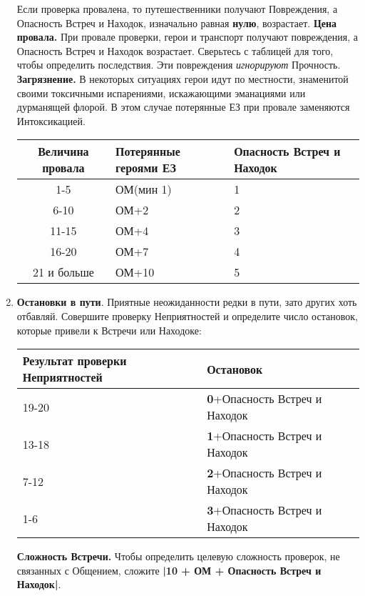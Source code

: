 \begin{enumerate}
\begin{center}
\begin{tabular}{|c|p{10cm}|}
\end{tabular}
\end{center}
Если проверка провалена, то путешественники получают Повреждения, а Опасность Встреч и Находок, изначально равная \textbf{нулю}, возрастает.
\newline \textbf{Цена провала.} При провале проверки, герои и транспорт получают повреждения, а Опасность Встреч и Находок возрастает. Сверьтесь с таблицей для того, чтобы определить последствия. Эти повреждения \textit{игнорируют} Прочность.
\newline \textbf{Загрязнение.} В некоторых ситуациях герои идут по местности, знаменитой своими токсичными испарениями, искажающими эманациями или дурманящей флорой. В этом случае потерянные ЕЗ при провале заменяются Интоксикацией.
\begin{center}
\begin{tabular}{|c|p{5cm}|p{5cm}|}
\hline
Величина провала & Потерянные героями ЕЗ & Опасность Встреч и Находок \\ \hline
1-5 & ОМ(мин 1) & 1 \\ \hline
6-10 & ОМ+2 & 2 \\ \hline
11-15 & ОМ+4 & 3 \\ \hline
16-20 & ОМ+7 & 4 \\ \hline
21 и больше & ОМ+10 & 5 \\ \hline
\end{tabular}
\end{center}
\item \textbf{Остановки в пути}. Приятные неожиданности редки в пути, зато других хоть отбавляй. Совершите проверку Неприятностей и определите число остановок, которые привели к Встречи или Находоке:
\begin{center}
\begin{tabular}{ |p{2.7cm}|p{12cm}| }
\hline
\textbf{Результат проверки Неприятностей} & \textbf{Остановок}
\\ \hline
19-20 & \textbf{0}+Опасность Встреч и Находок
\\ \hline
13-18 & \textbf{1}+Опасность Встреч и Находок
\\ \hline
7-12 & \textbf{2}+Опасность Встреч и Находок
\\ \hline
1-6 & \textbf{3}+Опасность Встреч и Находок
\\ \hline
\end{tabular}
\end{center}
\textbf{Сложность Встречи.} Чтобы определить целевую сложность проверок, не связанных с Общением, сложите \textbf{|10 + ОМ + Опасность Встреч и Находок|}.

\end{enumerate}
